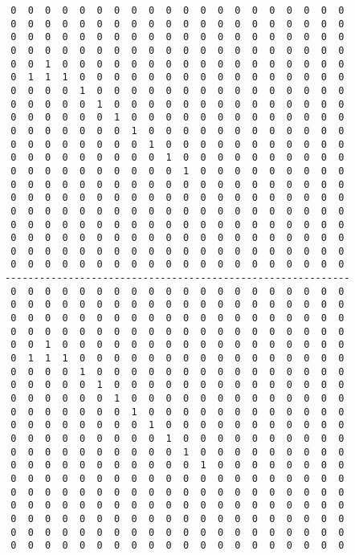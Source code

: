 \begin{verbatim}
 0  0  0  0  0  0  0  0  0  0  0  0  0  0  0  0  0  0  0  0
 0  0  0  0  0  0  0  0  0  0  0  0  0  0  0  0  0  0  0  0
 0  0  0  0  0  0  0  0  0  0  0  0  0  0  0  0  0  0  0  0
 0  0  0  0  0  0  0  0  0  0  0  0  0  0  0  0  0  0  0  0
 0  0  1  0  0  0  0  0  0  0  0  0  0  0  0  0  0  0  0  0
 0  1  1  1  0  0  0  0  0  0  0  0  0  0  0  0  0  0  0  0
 0  0  0  0  1  0  0  0  0  0  0  0  0  0  0  0  0  0  0  0
 0  0  0  0  0  1  0  0  0  0  0  0  0  0  0  0  0  0  0  0
 0  0  0  0  0  0  1  0  0  0  0  0  0  0  0  0  0  0  0  0
 0  0  0  0  0  0  0  1  0  0  0  0  0  0  0  0  0  0  0  0
 0  0  0  0  0  0  0  0  1  0  0  0  0  0  0  0  0  0  0  0
 0  0  0  0  0  0  0  0  0  1  0  0  0  0  0  0  0  0  0  0
 0  0  0  0  0  0  0  0  0  0  1  0  0  0  0  0  0  0  0  0
 0  0  0  0  0  0  0  0  0  0  0  0  0  0  0  0  0  0  0  0
 0  0  0  0  0  0  0  0  0  0  0  0  0  0  0  0  0  0  0  0
 0  0  0  0  0  0  0  0  0  0  0  0  0  0  0  0  0  0  0  0
 0  0  0  0  0  0  0  0  0  0  0  0  0  0  0  0  0  0  0  0
 0  0  0  0  0  0  0  0  0  0  0  0  0  0  0  0  0  0  0  0
 0  0  0  0  0  0  0  0  0  0  0  0  0  0  0  0  0  0  0  0
 0  0  0  0  0  0  0  0  0  0  0  0  0  0  0  0  0  0  0  0
------------------------------------------------------------
 0  0  0  0  0  0  0  0  0  0  0  0  0  0  0  0  0  0  0  0
 0  0  0  0  0  0  0  0  0  0  0  0  0  0  0  0  0  0  0  0
 0  0  0  0  0  0  0  0  0  0  0  0  0  0  0  0  0  0  0  0
 0  0  0  0  0  0  0  0  0  0  0  0  0  0  0  0  0  0  0  0
 0  0  1  0  0  0  0  0  0  0  0  0  0  0  0  0  0  0  0  0
 0  1  1  1  0  0  0  0  0  0  0  0  0  0  0  0  0  0  0  0
 0  0  0  0  1  0  0  0  0  0  0  0  0  0  0  0  0  0  0  0
 0  0  0  0  0  1  0  0  0  0  0  0  0  0  0  0  0  0  0  0
 0  0  0  0  0  0  1  0  0  0  0  0  0  0  0  0  0  0  0  0
 0  0  0  0  0  0  0  1  0  0  0  0  0  0  0  0  0  0  0  0
 0  0  0  0  0  0  0  0  1  0  0  0  0  0  0  0  0  0  0  0
 0  0  0  0  0  0  0  0  0  1  0  0  0  0  0  0  0  0  0  0
 0  0  0  0  0  0  0  0  0  0  1  0  0  0  0  0  0  0  0  0
 0  0  0  0  0  0  0  0  0  0  0  1  0  0  0  0  0  0  0  0
 0  0  0  0  0  0  0  0  0  0  0  0  0  0  0  0  0  0  0  0
 0  0  0  0  0  0  0  0  0  0  0  0  0  0  0  0  0  0  0  0
 0  0  0  0  0  0  0  0  0  0  0  0  0  0  0  0  0  0  0  0
 0  0  0  0  0  0  0  0  0  0  0  0  0  0  0  0  0  0  0  0
 0  0  0  0  0  0  0  0  0  0  0  0  0  0  0  0  0  0  0  0
 0  0  0  0  0  0  0  0  0  0  0  0  0  0  0  0  0  0  0  0
\end{verbatim}
\pagebreak
